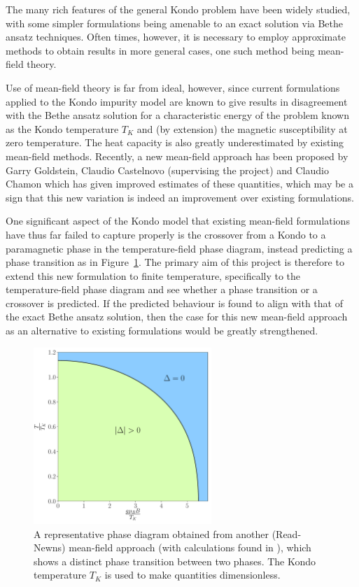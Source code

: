 \documentclass[12pt]{article}
\begin{document}
The many rich features of the general Kondo problem have been widely studied, with some simpler formulations being amenable to an exact solution via Bethe ansatz techniques. Often times, however, it is necessary to employ approximate methods to obtain results in more general cases, one such method being mean-field theory.

Use of mean-field theory is far from ideal, however, since current formulations applied to the Kondo impurity model are known to give results in disagreement with the Bethe ansatz solution for a characteristic energy of the problem known as the Kondo temperature $ T_{K} $ and (by extension) the magnetic susceptibility at zero temperature. The heat capacity is also greatly underestimated by existing mean-field methods. Recently, a new mean-field approach has been proposed by Garry Goldstein, Claudio Castelnovo (supervising the project) and Claudio Chamon which has given improved estimates of these quantities, which may be a sign that this new variation is indeed an improvement over existing formulations.

One significant aspect of the Kondo model that existing mean-field formulations have thus far failed to capture properly is the crossover from a Kondo to a paramagnetic phase in the temperature-field phase diagram, instead predicting a phase transition as in Figure~\ref{fig:phase_diagram}. The primary aim of this project is therefore to extend this new formulation to finite temperature, specifically to the temperature-field phase diagram and see whether a phase transition or a crossover is predicted. If the predicted behaviour is found to align with that of the exact Bethe ansatz solution, then the case for this new mean-field approach as an alternative to existing formulations would be greatly strengthened.

\begin{figure}[ht]
  \centering
  \includegraphics[width=0.6\textwidth]{Figures/phase_diagram.pdf}
  \caption{A representative phase diagram obtained from another (Read-Newns) mean-field approach (with calculations found in \cite{ManyBodyPhysics}), which shows a distinct phase transition between two phases. The Kondo temperature $ T_K $ is used to make quantities dimensionless.}
  \label{fig:phase_diagram}
\end{figure}
\end{document}
